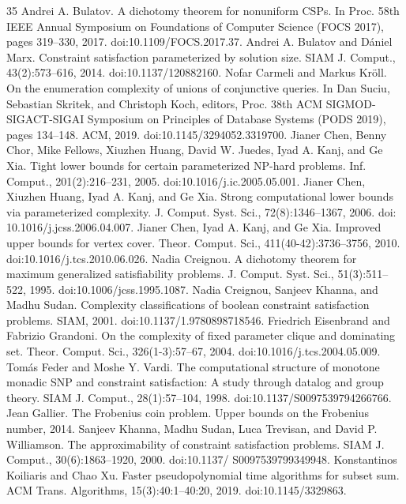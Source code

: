 \documentclass[10pt,a4paper]{article}
\begin{document}
\begin{thebibliography}{35}
Andrei A. Bulatov. A dichotomy theorem for nonuniform CSPs. In Proc. 58th IEEE Annual Symposium on Foundations of Computer Science (FOCS 2017), pages 319–330, 2017. doi:10.1109/FOCS.2017.37.
Andrei A. Bulatov and Dániel Marx. Constraint satisfaction parameterized by solution size. SIAM J. Comput., 43(2):573–616, 2014. doi:10.1137/120882160.
Nofar Carmeli and Markus Kröll. On the enumeration complexity of unions of conjunctive queries. In Dan Suciu, Sebastian Skritek, and Christoph Koch, editors, Proc. 38th ACM SIGMOD-SIGACT-SIGAI Symposium on Principles of Database Systems (PODS 2019), pages 134–148. ACM, 2019. doi:10.1145/3294052.3319700.
Jianer Chen, Benny Chor, Mike Fellows, Xiuzhen Huang, David W. Juedes, Iyad A. Kanj, and Ge Xia. Tight lower bounds for certain parameterized NP-hard problems. Inf. Comput., 201(2):216–231, 2005. doi:10.1016/j.ic.2005.05.001.
Jianer Chen, Xiuzhen Huang, Iyad A. Kanj, and Ge Xia. Strong computational lower bounds via parameterized complexity. J. Comput. Syst. Sci., 72(8):1346–1367, 2006. doi: 10.1016/j.jcss.2006.04.007.
Jianer Chen, Iyad A. Kanj, and Ge Xia. Improved upper bounds for vertex cover. Theor. Comput. Sci., 411(40-42):3736–3756, 2010. doi:10.1016/j.tcs.2010.06.026.
Nadia Creignou. A dichotomy theorem for maximum generalized satisfiability problems. J. Comput. Syst. Sci., 51(3):511–522, 1995. doi:10.1006/jcss.1995.1087.
Nadia Creignou, Sanjeev Khanna, and Madhu Sudan. Complexity classifications of boolean constraint satisfaction problems. SIAM, 2001. doi:10.1137/1.9780898718546.
Friedrich Eisenbrand and Fabrizio Grandoni. On the complexity of fixed parameter clique and dominating set. Theor. Comput. Sci., 326(1-3):57–67, 2004. doi:10.1016/j.tcs.2004.05.009.
Tomás Feder and Moshe Y. Vardi. The computational structure of monotone monadic SNP and constraint satisfaction: A study through datalog and group theory. SIAM J. Comput., 28(1):57–104, 1998. doi:10.1137/S0097539794266766.
Jean Gallier. The Frobenius coin problem. Upper bounds on the Frobenius number, 2014.
Sanjeev Khanna, Madhu Sudan, Luca Trevisan, and David P. Williamson. The approximability of constraint satisfaction problems. SIAM J. Comput., 30(6):1863–1920, 2000. doi:10.1137/ S0097539799349948.
Konstantinos Koiliaris and Chao Xu. Faster pseudopolynomial time algorithms for subset sum. ACM Trans. Algorithms, 15(3):40:1–40:20, 2019. doi:10.1145/3329863.

\end{thebibliography}
\end{document}

